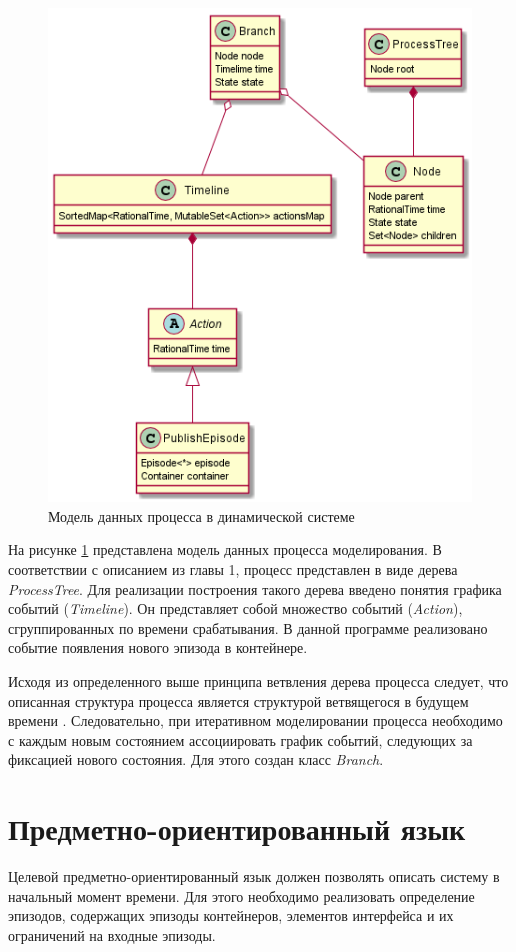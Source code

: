 \begin{figure}[h]
	\centering
	\includegraphics[width=0.7\linewidth]{images/runtimemodel}
	\caption{Модель данных процесса в динамической системе}
	\label{fig:runtimemodel}
\end{figure}

На рисунке \ref{fig:runtimemodel} представлена модель данных процесса моделирования.
В соответствии с описанием из главы 1, процесс представлен в виде дерева \textit{ProcessTree}.
Для реализации построения такого дерева введено понятия графика событий (\textit{Timeline}).
Он представляет собой множество событий (\textit{Action}), сгруппированных по времени срабатывания. 
В данной программе реализовано событие появления нового эпизода в контейнере.

Исходя из определенного выше принципа ветвления дерева процесса следует, что описанная структура процесса является структурой ветвящегося в будущем времени \cite{ben1983temporal}. 
Следовательно, при итеративном моделировании процесса необходимо с каждым новым состоянием ассоциировать график событий, следующих за фиксацией нового состояния. 
Для этого создан класс \textit{Branch}.

\section{Предметно-ориентированный язык}
Целевой предметно-ориентированный язык должен позволять описать систему в начальный момент времени. 
Для этого необходимо реализовать определение эпизодов, содержащих эпизоды контейнеров, элементов интерфейса и их ограничений на входные эпизоды.

